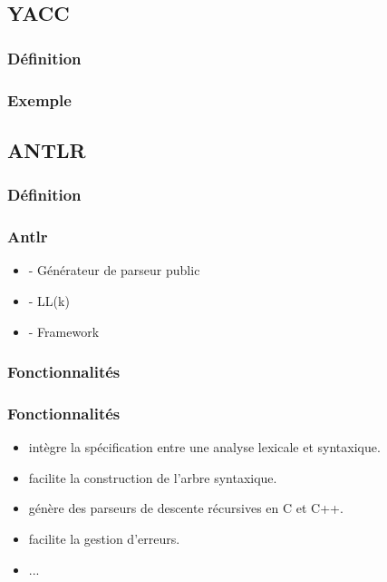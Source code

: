 \documentclass{beamer}
\begin{document}
\subsection{YACC}



\subsubsection{Définition}



\subsubsection{Exemple}



\subsection{ANTLR}



\subsubsection{Définition}

	\begin{frame}
	\frametitle{Antlr}
 \begin{itemize}
			\item - Générateur de parseur public
			\item - LL(k)
			\item - Framework
			
\end{itemize}
\end{frame} 

\subsubsection{Fonctionnalités}

		\begin{frame}
	\frametitle{Fonctionnalités}
 \begin{itemize}
			\item intègre la spécification entre une analyse lexicale et syntaxique.
			\item facilite la construction de l’arbre syntaxique.
			\item génère des parseurs de descente récursives en C et C++.
			\item facilite la gestion d’erreurs.
			\item ...		
\end{itemize}
\end{frame} 
\end{document}
